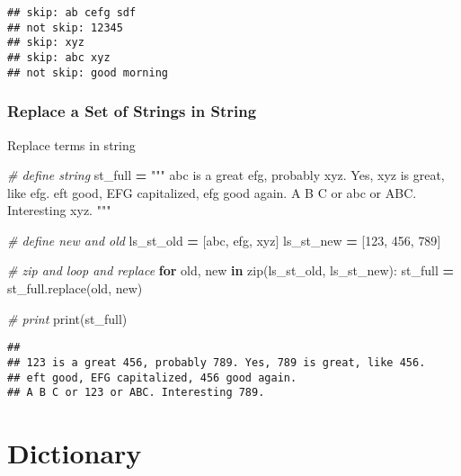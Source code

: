 \documentclass[
]{book}
\newenvironment{Shaded}{\begin{snugshade}}{\end{snugshade}}
\newcommand{\BuiltInTok}[1]{#1}
\newcommand{\CommentTok}[1]{\textcolor[rgb]{0.56,0.35,0.01}{\textit{#1}}}
\newcommand{\ControlFlowTok}[1]{\textcolor[rgb]{0.13,0.29,0.53}{\textbf{#1}}}
\newcommand{\KeywordTok}[1]{\textcolor[rgb]{0.13,0.29,0.53}{\textbf{#1}}}
\newcommand{\NormalTok}[1]{#1}
\newcommand{\OperatorTok}[1]{\textcolor[rgb]{0.81,0.36,0.00}{\textbf{#1}}}
\newcommand{\StringTok}[1]{\textcolor[rgb]{0.31,0.60,0.02}{#1}}
\begin{document}
\begin{verbatim}
## skip: ab cefg sdf
## not skip: 12345
## skip: xyz
## skip: abc xyz
## not skip: good morning
\end{verbatim}

\hypertarget{replace-a-set-of-strings-in-string}{%
\subsubsection{Replace a Set of Strings in String}\label{replace-a-set-of-strings-in-string}}

Replace terms in string

\begin{Shaded}
\begin{Highlighting}[]
\CommentTok{\# define string}
\NormalTok{st\_full }\OperatorTok{=} \StringTok{"""}
\StringTok{abc is a great efg, probably xyz. Yes, xyz is great, like efg. }
\StringTok{eft good, EFG capitalized, efg good again. }
\StringTok{A B C or abc or ABC. Interesting xyz. }
\StringTok{"""}

\CommentTok{\# define new and old}
\NormalTok{ls\_st\_old }\OperatorTok{=}\NormalTok{ [}\StringTok{\textquotesingle{}abc\textquotesingle{}}\NormalTok{, }\StringTok{\textquotesingle{}efg\textquotesingle{}}\NormalTok{, }\StringTok{\textquotesingle{}xyz\textquotesingle{}}\NormalTok{]}
\NormalTok{ls\_st\_new }\OperatorTok{=}\NormalTok{ [}\StringTok{\textquotesingle{}123\textquotesingle{}}\NormalTok{, }\StringTok{\textquotesingle{}456\textquotesingle{}}\NormalTok{, }\StringTok{\textquotesingle{}789\textquotesingle{}}\NormalTok{]}

\CommentTok{\# zip and loop and replace}
\ControlFlowTok{for}\NormalTok{ old, new }\KeywordTok{in} \BuiltInTok{zip}\NormalTok{(ls\_st\_old, ls\_st\_new):}
\NormalTok{  st\_full }\OperatorTok{=}\NormalTok{ st\_full.replace(old, new)}

\CommentTok{\# print}
\BuiltInTok{print}\NormalTok{(st\_full)}
\end{Highlighting}
\end{Shaded}

\begin{verbatim}
## 
## 123 is a great 456, probably 789. Yes, 789 is great, like 456. 
## eft good, EFG capitalized, 456 good again. 
## A B C or 123 or ABC. Interesting 789.
\end{verbatim}

\hypertarget{dictionary}{%
\section{Dictionary}\label{dictionary}}
\end{document}
